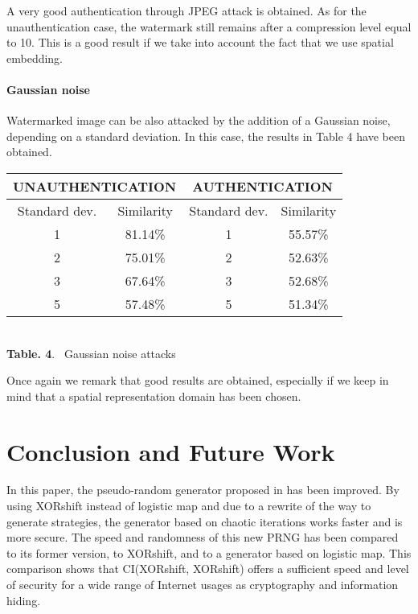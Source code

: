 \documentclass[journal]{IEEEtran}
\begin{document}
A very good authentication through JPEG attack is obtained. As for the
unauthentication case, the watermark still remains after a compression level
equal to 10. This is a good result if we take into account the fact that we
use spatial embedding.

\paragraph{Gaussian noise}

Watermarked image can be also attacked by the addition of a Gaussian noise, depending on a standard deviation. In this case, the results in Table 4 have been obtained.


\begin{center}
\begin{footnotesize}
\begin{tabular}{|c|c||c|c|}
\hline
\multicolumn{2}{|c||}{UNAUTHENTICATION}  & \multicolumn{2}{c|}{AUTHENTICATION}\\ 
\hline
Standard dev. & Similarity & Standard dev. & Similarity \\
 \hline
1 & 81.14\% & 1 & 55.57\% \\
2 & 75.01\% & 2 & 52.63\% \\
3 & 67.64\% & 3 & 52.68\% \\
5 & 57.48\% & 5 & 51.34\% \\
\hline
\end{tabular}
\end{footnotesize}\\
\vspace{0.5cm}
\textbf{Table. 4}. ~Gaussian noise attacks
\end{center}


Once again we remark that good results are obtained, especially if we keep in
mind that a spatial representation domain has been chosen.




\section{Conclusion and Future Work}
\label{Conclusions and Future Work}



In this paper, the pseudo-random generator proposed in \cite{wang2009} has been improved. By using XORshift instead of logistic map and due to a rewrite of the way to generate strategies, the generator based on chaotic iterations works faster and is more secure. The speed and randomness of this new PRNG has been compared to its former version, to XORshift, and to a generator based on logistic map. This comparison shows that CI(XORshift, XORshift) offers a sufficient speed and level of security for a wide range of Internet usages as cryptography and information hiding.
\end{document}

